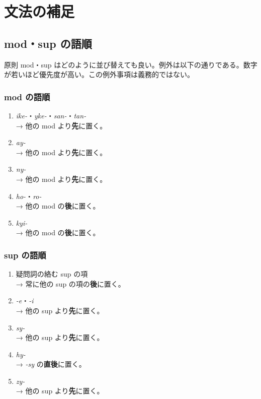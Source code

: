 \chapter{文法の補足}

\section{mod・sup の語順}

原則 mod・sup はどのように並び替えても良い。例外は以下の通りである。数字が若いほど優先度が高い。この例外事項は義務的ではない。

\begin{multicols}{2}
    \subsection{mod の語順}

    \begin{enumerate}
        \item \emph{ike-}・\emph{yke-}・\emph{san-}・\emph{tan-} \\ → 他の mod より\textbf{先}に置く。
        \item \emph{ay-} \\ → 他の mod より\textbf{先}に置く。
        \item \emph{ny-} \\ → 他の mod より\textbf{先}に置く。
        \item \emph{ho-}・\emph{ro-} \\ → 他の mod の\textbf{後}に置く。
        \item \emph{kyi-} \\ → 他の mod の\textbf{後}に置く。
    \end{enumerate}

    \columnbreak

    \subsection{sup の語順}

    \begin{enumerate}
        \item 疑問詞の絡む sup の項 \\ → 常に他の sup の項の\textbf{後}に置く。
        \item \emph{-e}・\emph{-i} \\ → 他の sup より\textbf{先}に置く。
        \item \emph{sy-} \\ → 他の sup より\textbf{先}に置く。
        \item \emph{hy-} \\ → \emph{-sy} の\textbf{直後}に置く。
        \item \emph{zy-} \\ → 他の sup より\textbf{先}に置く。
    \end{enumerate}
\end{multicols}

